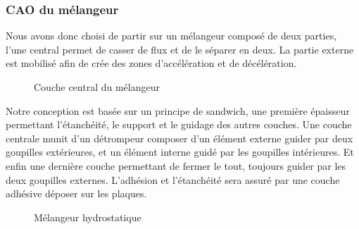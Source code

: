\documentclass[a4paper, 11pt]{article}
\begin{document}
\subsubsection{CAO du mélangeur}
Nous avons donc choisi de partir sur un mélangeur composé de deux parties, l'une central permet de casser de flux et de le séparer en deux.
La partie externe est mobilisé afin de crée des zones d'accélération et de décélération.
\begin{figure}[H]
    \centering
    \caption{Couche central du mélangeur}
    \label{fig:CAO_melangeur_couche2}
\end{figure}
Notre conception est basée sur un principe de sandwich, une première épaisseur permettant l'étanchéité, le support et le guidage des autres couches.
Une couche centrale munit d'un détrompeur composer d'un élément externe guider par deux goupilles extérieures, et un élément interne guidé par les goupilles intérieures.
Et enfin une dernière couche permettant de fermer le tout, toujours guider par les deux goupilles externes.
L'adhésion et l'étanchéité sera assuré par une couche adhésive déposer sur les plaques.
\begin{figure}[H]
    \centering
    \caption{Mélangeur hydrostatique}
    \label{fig:CAO_melangeur}
\end{figure}
\end{document}
